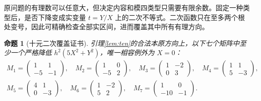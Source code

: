 \documentclass[11pt,a4paper,oneside,openany]{book}
\newtheorem{proposition}[theorem]{命题}
\theoremstyle{definition}
\numberwithin{equation}{chapter}
\begin{document}
原问题的有理数可以任意大，但决定内容和模四类型只需要有限余数。固定一种类型后，是否下降变成实变量 $t=Y/X$ 上的二次不等式。二次函数只在至多两个根处变号，因此可精确检查全部实区间，进而覆盖其中所有有理方向。
\begin{proposition}[十元二次覆盖证书]\label{prop:ten-certificate}
引理\ref{lem:ten}的合法本原方向上，以下七个矩阵中至少一个严格降低 $h^2(5X^2+Y^2)$，唯一相容例外为 $X=0$：
\[
\begin{gathered}
M_1=\begin{pmatrix}1&1\\-5&-1\end{pmatrix},\quad
M_2=\begin{pmatrix}1&0\\-5&2\end{pmatrix},\quad
M_3=\begin{pmatrix}1&-2\\0&3\end{pmatrix},\quad
M_4=\begin{pmatrix}1&1\\5&-3\end{pmatrix},\\
M_5=\begin{pmatrix}4&1\\0&-3\end{pmatrix},\quad
M_6=\begin{pmatrix}1&-2\\5&2\end{pmatrix},\quad
M_7=\begin{pmatrix}1&0\\-10&-1\end{pmatrix}.
\end{gathered}
\]
\end{proposition}
\end{document}
